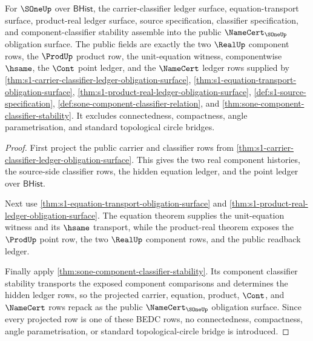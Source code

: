 \begin{theorem}
\label{thm:s1-public-namecert-obligation-assembly}
For $\SOneUp$ over $\mathsf{BHist}$, the carrier-classifier ledger surface,
equation-transport surface, product-real ledger surface, source
specification, classifier specification, and component-classifier stability
assemble into the public $\NameCert_{\SOneUp}$ obligation surface. The public
fields are exactly the two $\RealUp$ component rows, the $\ProdUp$ product row,
the unit-equation witness, componentwise $\hsame$, the $\Cont$ point ledger,
and the $\NameCert$ ledger rows supplied by
\autoref{thm:s1-carrier-classifier-ledger-obligation-surface},
\autoref{thm:s1-equation-transport-obligation-surface},
\autoref{thm:s1-product-real-ledger-obligation-surface},
\autoref{def:s1-source-specification},
\autoref{def:sone-component-classifier-relation}, and
\autoref{thm:sone-component-classifier-stability}. It excludes
connectedness, compactness, angle parametrisation, and standard topological
circle bridges.
\end{theorem}
\begin{proof}
First project the public carrier and classifier rows from
\autoref{thm:s1-carrier-classifier-ledger-obligation-surface}. This gives the
two real component histories, the source-side classifier rows, the hidden
equation ledger, and the point ledger over $\mathsf{BHist}$.

Next use \autoref{thm:s1-equation-transport-obligation-surface} and
\autoref{thm:s1-product-real-ledger-obligation-surface}. The equation theorem
supplies the unit-equation witness and its $\hsame$ transport, while the
product-real theorem exposes the $\ProdUp$ point row, the two $\RealUp$
component rows, and the public readback ledger.

Finally apply \autoref{thm:sone-component-classifier-stability}. Its
component classifier stability transports the exposed component comparisons
and determines the hidden ledger rows, so the projected carrier, equation,
product, $\Cont$, and $\NameCert$ rows repack as the public
$\NameCert_{\SOneUp}$ obligation surface. Since every projected row is one of
these BEDC rows, no connectedness, compactness, angle parametrisation, or
standard topological-circle bridge is introduced.
\end{proof}
